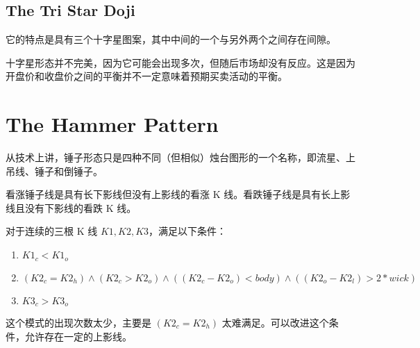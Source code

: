 \subsection*{The Tri Star Doji}
它的特点是具有三个十字星图案，其中中间的一个与另外两个之间存在间隙。

十字星形态并不完美，因为它可能会出现多次，但随后市场却没有反应。这是因为开盘价和收盘价之间的平衡并不一定意味着预期买卖活动的平衡。
\section{The Hammer Pattern}
从技术上讲，锤子形态只是四种不同（但相似）烛台图形的一个名称，即流星、上吊线、锤子和倒锤子。

看涨锤子线是具有长下影线但没有上影线的看涨 K 线。看跌锤子线是具有长上影线且没有下影线的看跌 K 线。

对于连续的三根 K 线 $K1, K2, K3$，满足以下条件：
\begin{enumerate}
    \item $K1_c < K1_o$
    \item $(K2_c=K2_h) \land (K2_c > K2_o) \land ((K2_c-K2_o)<body) \land ((K2_o-K2_l)>2*wick)$
    \item $K3_c>K3_o$
\end{enumerate}
\begin{tcolorbox}[title=警告！,colframe=red!80!black]
    这个模式的出现次数太少，主要是 $(K2_c=K2_h)$ 太难满足。可以改进这个条件，允许存在一定的上影线。
\end{tcolorbox}